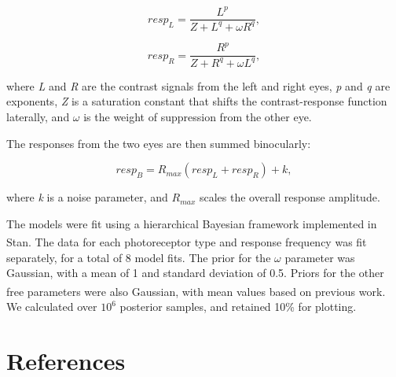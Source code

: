 \documentclass[
]{article}
\begin{document}
\begin{equation}
\label{eq:respL}
resp_L = \frac{L^p}{Z + L^q + \omega R^q},
\end{equation}

\begin{equation}
\label{eq:respR}
resp_R = \frac{R^p}{Z + R^q + \omega L^q},
\end{equation}

\noindent where \emph{L} and \emph{R} are the contrast signals from the left and right eyes, \emph{p} and \emph{q} are exponents, \emph{Z} is a saturation constant that shifts the contrast-response function laterally, and \(\omega\) is the weight of suppression from the other eye.

The responses from the two eyes are then summed binocularly:

\begin{equation}
\label{eq:respB}
resp_B = R_{max}(resp_L + resp_R) + k,
\end{equation}

\noindent where \emph{k} is a noise parameter, and \(R_{max}\) scales the overall response amplitude.

The models were fit using a hierarchical Bayesian framework implemented in Stan\textsuperscript{}. The data for each photoreceptor type and response frequency was fit separately, for a total of 8 model fits. The prior for the \(\omega\) parameter was Gaussian, with a mean of 1 and standard deviation of 0.5. Priors for the other free parameters were also Gaussian, with mean values based on previous work\textsuperscript{}. We calculated over \ensuremath{10^{6}} posterior samples, and retained 10\% for plotting.

\section{References}\label{references}
\end{document}
